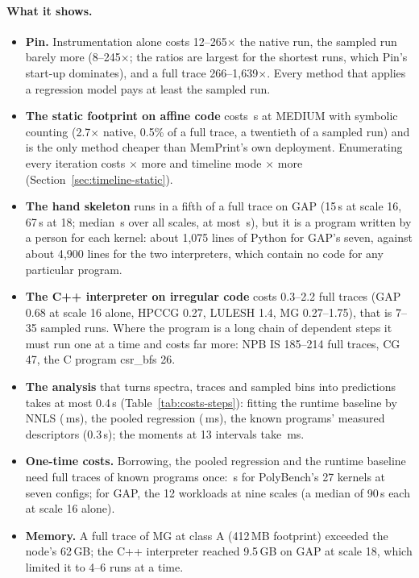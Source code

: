 \documentclass[11pt]{article}
\newcommand{\memprint}{MemPrint}
\newcommand{\secref}[1]{Section~\ref{#1}}
\newcommand{\tabref}[1]{Table~\ref{#1}}
\begin{document}
\paragraph{What it shows.}
\begin{itemize}
\item \textbf{Pin.} Instrumentation alone costs 12--265$\times$ the native run, the sampled run barely more
(8--245$\times$; the ratios are largest for the shortest runs, which Pin's start-up dominates), and a full trace
266--1{,}639$\times$. Every method that applies a regression model pays at least the sampled run.
\item \textbf{The static footprint on affine code} costs \numcsymMedianS\,s at MEDIUM with symbolic counting
(2.7$\times$ native, 0.5\% of a full trace, a twentieth of a sampled run) and is the only method cheaper than
\memprint{}'s own deployment. Enumerating every iteration costs \numcenuCostX$\times$ more and timeline mode
\numctlCostX$\times$ more (\secref{sec:timeline-static}).
\item \textbf{The hand skeleton} runs in a fifth of a full trace on GAP (15\,s at scale 16, 67\,s at 18; median
\numcskelMedianS\,s over all scales, at most \numcskelMaxS\,s), but it is a program written by a person for each
kernel: about 1{,}075 lines of Python for GAP's seven, against about 4{,}900 lines for the two interpreters, which
contain no code for any particular program.
\item \textbf{The C++ interpreter on irregular code} costs 0.3--2.2 full traces (GAP 0.68 at scale 16 alone, HPCCG
0.27, LULESH 1.4, MG 0.27--1.75), that is 7--35 sampled runs. Where the program is a long chain of dependent steps it
must run one at a time and costs far more: NPB IS 185--214 full traces, CG 47, the C program csr\_bfs 26.
\item \textbf{The analysis} that turns spectra, traces and sampled bins into predictions takes at most 0.4\,s
(\tabref{tab:costs-steps}): fitting the runtime baseline by NNLS (\numcbaselineFitMs\,ms), the pooled regression
(\numcpooledMs\,ms), the known programs' measured descriptors (0.3\,s); the moments at 13 intervals take
\numcmomentsMs\,ms.
\item \textbf{One-time costs.} Borrowing, the pooled regression and the runtime baseline need full traces of known
programs once: \numovOneTime\,s for PolyBench's 27 kernels at seven configs; for GAP, the 12 workloads at nine scales
(a median of 90\,s each at scale 16 alone).
\item \textbf{Memory.} A full trace of MG at class A (412\,MB footprint) exceeded the node's 62\,GB; the C++
interpreter reached 9.5\,GB on GAP at scale 18, which limited it to 4--6 runs at a time.
\end{itemize}
\end{document}
